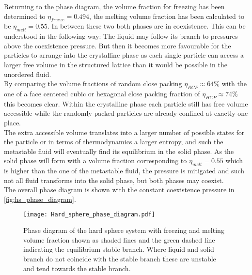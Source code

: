 Returning to the phase diagram, the volume fraction for freezing has been determined to $\eta_{freeze} = 0.494$, the melting volume fraction has been calculated to be $\eta_{melt}=0.55$. In between these two both phases are in coexistence. This can be understood in the following way: The liquid may follow its branch to pressures above the coexistence pressure. But then it becomes more favourable for the particles to arrange into the crystalline phase as each single particle can access a larger free volume in the structured lattice than it would be possible in the unordered fluid.\\
By comparing the volume fractions of random close packing $\eta_{RCP}\approx 64\%$ with the one of a face centered cubic or hexagonal close packing fraction of $\eta_{HCP} \approx 74 \%$ this becomes clear. Within the crystalline phase each particle still has free volume accessible while the randomly packed particles are already confined at exactly one place.\\
The extra accessible volume translates into a larger number of possible states for the particle or in terms of thermodynamics a larger entropy, and such the metastable fluid will eventually find its equilibrium in the solid phase. As the solid phase will form with a volume fraction corresponding to $\eta_{melt}=0.55$ which is higher than the one of the metastable fluid, the pressure is mitigated and such not all fluid transforms into the solid phase, but both phases may coexist.\\
The overall phase diagram is shown with the constant coexistence pressure in \autoref{fig:hs_phase_diagram}.\\
\begin{figure}[h]
\centering
\texttt{[image: Hard\_sphere\_phase\_diagram.pdf]}
\caption{Phase diagram of the hard sphere system with freezing and melting volume fraction shown as shaded lines and the green dashed line indicating the equilibrium stable branch. Where liquid and solid branch do not coincide with the stable branch these are unstable and tend towards the stable branch.}
\label{fig:hs_phase_diagram}
\end{figure}





